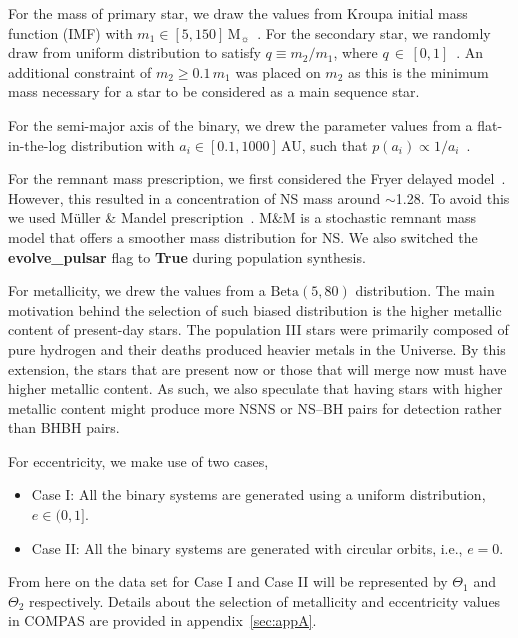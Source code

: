 \documentclass[twocolumn, twocolappendix]{aastex63}
\begin{document}
    For the mass of primary star, we draw the values from Kroupa initial mass function (IMF) with $m_1 \in [5, 150]\,\text{M}_\sun$~\citep{Kroupa2001}.
    For the secondary star, we randomly draw from uniform distribution to satisfy $q\equiv m_2/m_1$, where $q\,\in\,[0, 1]$~\citep{Sana2012}.
    An additional constraint of $m_2 \geq 0.1\,m_1$ was placed on $m_2$ as this is the minimum mass necessary for a star to be considered as a main sequence star.

    For the semi-major axis of the binary, we drew the parameter values from a flat-in-the-log distribution with $a_i \in [0.1, 1000]\,$AU, such that $p(a_i) \propto 1/a_i$~\citep{Opik1924}.

    For the remnant mass prescription, we first considered the Fryer delayed model~\citep{Fryer2012}.
    However, this resulted in a concentration of NS mass around $\sim$\SI{1.28}{\Msun}.
    To avoid this we used Müller \& Mandel prescription~\citep[M\&M;][]{Mandel2020}.
    M\&M is a stochastic remnant mass model that offers a smoother mass distribution for NS\@.
    We also switched the \textbf{evolve\_pulsar} flag to \textbf{True} during population synthesis.

    For metallicity, we drew the values from a $\text{Beta}(5, 80)$ distribution.
    The main motivation behind the selection of such biased distribution is the higher metallic content of present-day stars.
    The population III stars were primarily composed of pure hydrogen and their deaths produced heavier metals in the Universe.
    By this extension, the stars that are present now or those that will merge now must have higher metallic content.
    As such, we also speculate that having stars with higher metallic content might produce more NSNS or NS--BH pairs for detection rather than BHBH pairs.

    For eccentricity, we make use of two cases,
    \begin{itemize}
        \item Case I: All the binary systems are generated using a uniform distribution, $e \in (0, 1]$.
        \item Case II: All the binary systems are generated with circular orbits, i.e., $e = 0$.
    \end{itemize}

    From here on the data set for Case I and Case II will be represented by $\Theta_1$ and $\Theta_2$ respectively.
    Details about the selection of metallicity and eccentricity values in COMPAS are provided in appendix~\ref{sec:appA}.
\end{document}
